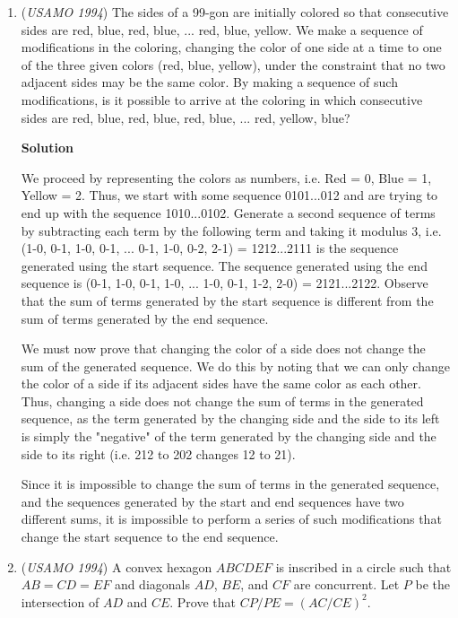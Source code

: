\begin{enumerate}
	\item (\textit{USAMO 1994}) The sides of a 99-gon are initially colored so that consecutive sides are red, blue, red, blue, ...  red, blue, yellow. We make a sequence of modifications in the coloring, changing the color of one side at a time to one of the three given colors (red, blue, yellow), under the constraint that no two adjacent sides may be the same color. By making a sequence of such modifications, is it possible to arrive at the coloring in which consecutive sides 
are red, blue, red, blue, red, blue, ...  red, yellow, blue?


 



\textbf{Solution}

We proceed by representing the colors as numbers, i.e. Red = 0, Blue = 1, Yellow = 2. Thus, we start with some sequence 0101...012 and are trying to end up with the sequence 1010...0102. Generate a second sequence of terms by subtracting each term by the following term and taking it modulus 3, i.e. (1-0, 0-1, 1-0, 0-1, ... 0-1, 1-0, 0-2, 2-1) = 1212...2111 is the sequence generated using the start sequence. The sequence generated using the end sequence is (0-1, 1-0, 0-1, 1-0, ... 1-0, 0-1, 1-2, 2-0) = 2121...2122. Observe that the sum of terms generated by the start sequence is different from the sum of terms generated by the end sequence.

 We must now prove that changing the color of a side does not change the sum of the generated sequence. We do this by noting that we can only change the color of a side if its adjacent sides have the same color as each other. Thus, changing a side does not change the sum of terms in the generated sequence, as the term generated by the changing side and the side to its left is simply the "negative" of the term generated by the changing side and the side to its right (i.e. 212 to 202 changes 12 to 21).

 Since it is impossible to change the sum of terms in the generated sequence, and the sequences generated by the start and end sequences have two different sums, it is impossible to perform a series of such modifications that change the start sequence to the end sequence.

 


	\item (\textit{USAMO 1994}) A convex hexagon $ABCDEF$ is inscribed in a circle such that $AB = CD = EF$ and diagonals $AD$, $BE$, and $CF$ are concurrent. Let $P$ be the intersection of $AD$ and $CE$. Prove that $CP/PE = (AC/CE)^2$.



\end{enumerate}
